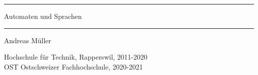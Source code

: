 \documentclass[a4paper,12pt]{book}
\begin{document}
\pagestyle{fancy}
\rhead{}
\frontmatter
\newcommand\HRule{\noindent\rule{\linewidth}{1.5pt}}
\begin{titlepage}
\HRule
\vspace*{10pt}
\begin{flushright}
{\Huge Automaten und Sprachen}
\end{flushright}
\HRule
\begin{flushright}
\vspace{30pt}
\LARGE
Andreas Müller
\end{flushright}
\begin{center}
Hochschule für Technik, Rapperswil, 2011-2020\\
OST Ostschweizer Fachhochschule, 2020-2021
\end{center}
\end{titlepage}
\hypersetup{
    linktoc=all,
    linkcolor=blue
}
\tableofcontents
\newtheorem{satz}{Satz}[chapter]
\newtheorem{hilfssatz}[satz]{Hilfssatz}
\newtheorem{definition}[satz]{Definition}
\newtheorem{annahme}[satz]{Annahme}
\newenvironment{beispiel}[1][Beispiel]{%
\begin{proof}[#1]%
\renewcommand{\qedsymbol}{$\bigcirc$}
}{\end{proof}}
\def\blank{\text{\textvisiblespace}}
\mainmatter
\begin{refsection}









\appendix

\vfill
\pagebreak
\ifodd\value{page}\else\null\clearpage\fi
\lhead{}
\rhead{}
\printbibliography[heading=subbibliography]
\end{refsection}


\end{document}
